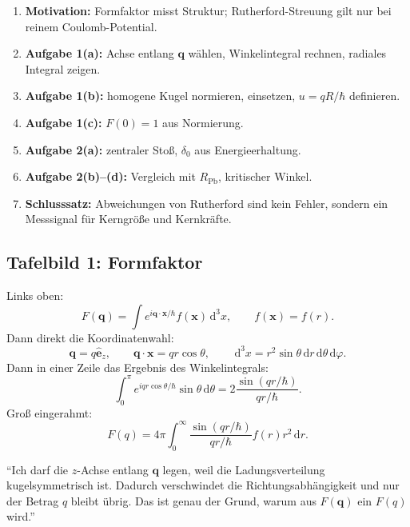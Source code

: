 \documentclass[11pt,a4paper]{scrartcl}
\newcommand{\dd}{\,\mathrm{d}}
\newcommand{\vect}[1]{\bm{#1}}
\newcommand{\unitvect}[1]{\hat{\bm{#1}}}
\begin{document}
\begin{summarybox}[title=Empfohlene Tafelgliederung]
\begin{enumerate}[label=\arabic*.]
    \item \textbf{Motivation:} Formfaktor misst Struktur; Rutherford-Streuung gilt nur bei reinem Coulomb-Potential.
    \item \textbf{Aufgabe 1(a):} Achse entlang $\vect{q}$ w\"ahlen, Winkelintegral rechnen, radiales Integral zeigen.
    \item \textbf{Aufgabe 1(b):} homogene Kugel normieren, einsetzen, $u=qR/\hbar$ definieren.
    \item \textbf{Aufgabe 1(c):} $F(0)=1$ aus Normierung.
    \item \textbf{Aufgabe 2(a):} zentraler Sto\ss{}, $\delta_0$ aus Energieerhaltung.
    \item \textbf{Aufgabe 2(b)--(d):} Vergleich mit $R_{\mathrm{Pb}}$, kritischer Winkel.
    \item \textbf{Schlusssatz:} Abweichungen von Rutherford sind kein Fehler, sondern ein Messsignal f\"ur Kerngr\"o\ss{}e und Kernkr\"afte.
\end{enumerate}
\end{summarybox}

\subsection{Tafelbild 1: Formfaktor}

\begin{calculationbox}[title=Tafelbild]
Links oben:
\[
    F(\vect{q})=\int e^{i\vect{q}\cdot\vect{x}/\hbar}f(\vect{x})\dd^3x,
    \qquad f(\vect{x})=f(r).
\]
Dann direkt die Koordinatenwahl:
\[
    \vect{q}=q\unitvect{e}_z,
    \qquad \vect{q}\cdot\vect{x}=qr\cos\theta,
    \qquad \dd^3x=r^2\sin\theta\dd r\dd\theta\dd\varphi.
\]
Dann in einer Zeile das Ergebnis des Winkelintegrals:
\[
    \int_0^\pi e^{iqr\cos\theta/\hbar}\sin\theta\dd\theta
    =2\frac{\sin(qr/\hbar)}{qr/\hbar}.
\]
Gro\ss{} eingerahmt:
\[
    F(q)=4\pi\int_0^\infty\frac{\sin(qr/\hbar)}{qr/\hbar}f(r)r^2\dd r.
\]
\end{calculationbox}

\begin{notebox}[title=Sprechtext dazu]
\enquote{Ich darf die $z$-Achse entlang $\vect{q}$ legen, weil die Ladungsverteilung kugelsymmetrisch ist. Dadurch verschwindet die Richtungsabh\"angigkeit und nur der Betrag $q$ bleibt \"ubrig. Das ist genau der Grund, warum aus $F(\vect{q})$ ein $F(q)$ wird.}
\end{notebox}
\end{document}

